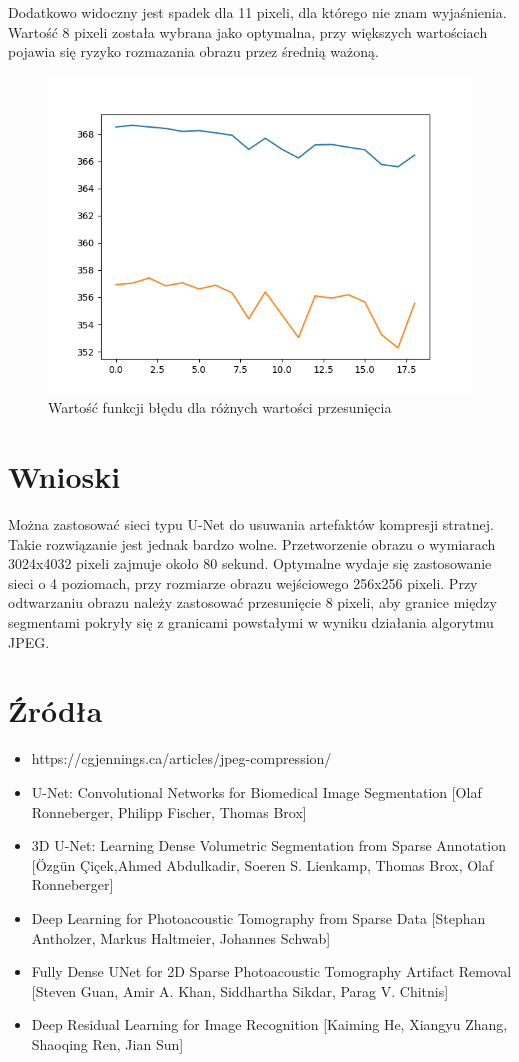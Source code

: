 \documentclass[a4paper,11pt]{article}
\begin{document}
Dodatkowo widoczny jest spadek dla 11 pixeli, dla którego nie znam wyjaśnienia.
Wartość 8 pixeli została wybrana jako optymalna, przy większych wartościach pojawia się ryzyko rozmazania obrazu przez średnią ważoną.
\newpage
\begin{figure}[h!]
\begin{center}
	\includegraphics[width=0.7\columnwidth]{overlap_and_loss.png}
	\caption{Wartość funkcji błędu dla różnych wartości przesunięcia}
\end{center}
\end{figure}
\section{Wnioski}
Można zastosować sieci typu U-Net do usuwania artefaktów kompresji stratnej.
Takie rozwiązanie jest jednak bardzo wolne. Przetworzenie obrazu o wymiarach 3024x4032 pixeli zajmuje około 80 sekund.
Optymalne wydaje się zastosowanie sieci o 4 poziomach, przy rozmiarze obrazu wejściowego 256x256 pixeli.
Przy odtwarzaniu obrazu należy zastosować przesunięcie 8 pixeli, aby granice między segmentami pokryły się z granicami powstałymi w wyniku działania algorytmu JPEG.

\section{Źródła}
\begin{itemize}
\item https://cgjennings.ca/articles/jpeg-compression/
\item U-Net: Convolutional Networks for Biomedical Image Segmentation [Olaf Ronneberger, Philipp Fischer, Thomas Brox]
\item 3D U-Net: Learning Dense Volumetric Segmentation from Sparse Annotation [Özgün Çiçek,Ahmed Abdulkadir, Soeren S. Lienkamp, Thomas Brox, Olaf Ronneberger]
\item Deep Learning for Photoacoustic Tomography from Sparse Data [Stephan Antholzer, Markus Haltmeier, Johannes Schwab]
\item Fully Dense UNet for 2D Sparse Photoacoustic Tomography Artifact Removal [Steven Guan, Amir A. Khan, Siddhartha Sikdar, Parag V. Chitnis]
\item Deep Residual Learning for Image Recognition [Kaiming He, Xiangyu Zhang, Shaoqing Ren, Jian Sun]

\end{itemize}
\end{document}
